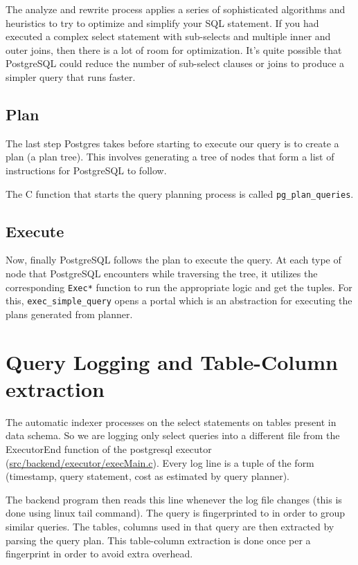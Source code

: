 \documentclass[runningheads]{llncs}
\begin{document}
The analyze and rewrite process applies a series of sophisticated algorithms and heuristics to try to optimize and simplify your SQL statement. If you had executed a complex select statement with sub-selects and multiple inner and outer joins, then there is a lot of room for optimization. It’s quite possible that PostgreSQL could reduce the number of sub-select clauses or joins to produce a simpler query that runs faster.

\subsection{Plan}
The last step Postgres takes before starting to execute our query is to create a plan (a plan tree). This involves generating a tree of nodes that form a list of instructions for PostgreSQL to follow.

The C function that starts the query planning process is called \texttt{pg\_plan\_queries}.

\subsection{Execute}
Now, finally PostgreSQL follows the plan to execute the query. At each type of node that PostgreSQL encounters while traversing the tree, it utilizes the corresponding \texttt{Exec*} function to run the appropriate logic and get the tuples. For this, \texttt{exec\_simple\_query} opens a portal which is an abstraction for executing the plans generated from planner.

\newpage 

\section{Query Logging and Table-Column extraction}
The automatic indexer processes on the select statements on tables present in data schema. So we are logging only select queries into a different file from the ExecutorEnd function of the postgresql executor (\url{src/backend/executor/execMain.c}). Every log line is a tuple of the form (timestamp, query statement, cost as estimated by query planner).  

The backend program then reads this line whenever the log file changes (this is done using linux tail command). The query is fingerprinted to in order to group similar queries. The tables, columns used in that query are then extracted by parsing the query plan. This table-column extraction is done once per a fingerprint in order to avoid extra overhead.
\end{document}

